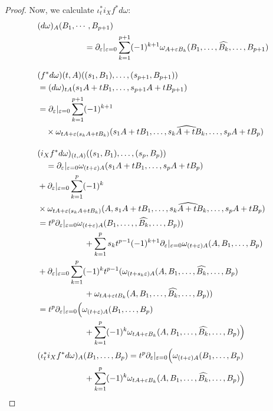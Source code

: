\documentclass[b5paper,draft,openbib,12pt]{memoir}
\begin{document}
\begin{proof}
Now, we calculate \(\iota^*_t i_X f^* d \omega\):
\begin{align}\notag
&(d\omega)_A(B_1,\cdots, B_{p+1})\\
&\hspace{2cm}=\partial_\varepsilon |_{\varepsilon=0} \sum_{k=1}^{p+1} (-1)^{k+1} \omega_{A+\varepsilon B_k}(B_1,\dots , \widehat{B_k}, \dots, B_{p+1})\\[0.3cm]
&(f^* d \omega){(t,A)}((s_1,B_1),\dots , (s_{p+1},B_{p+1}))\\\notag
&= (d\omega)_{tA}(s_1A + t B_1, \dots, s_{p+1}A+t B_{p+1})\\
&=\partial_{\varepsilon}|_{\varepsilon =0} \sum_{k=1}^{p+1}(-1)^{k+1}\\\notag
&\quad \times\omega_{tA + \varepsilon(s_kA + t B_k)}(s_1A+tB_1, \dots,  \widehat{s_k A + t B_k},\dots , s_p A  + t B_p )\\[0.4cm]
&(i_X f^* d \omega)_{(t,A)}((s_1,B_1),\dots , (s_p, B_p))\\\notag
&\quad= \partial_{\varepsilon} |_{\varepsilon =0} \omega_{(t+\varepsilon)A}(s_1A+tB_1, \dots, s_pA+t B_p)\\\notag
&+\partial_{\varepsilon}|_{\varepsilon=0} \sum_{k=1}^p (-1)^k\\\notag
&\times\omega_{tA + \varepsilon(s_k A + t B_k)} (A,s_1A+t B_1, \dots, \widehat{s_k A + t B_k},\dots, s_p A + t B_p)\\
&= t^p \partial_{\varepsilon}|_{\varepsilon=0}\omega_{(t+\varepsilon)A }(B_1,\dots, ,\widehat{B_k},\dots, B_p))\\
&\hspace{2cm}+ \sum_{k=1}^p s_k t^{p-1} (-1)^{k+1} \partial_{\varepsilon}|_{\varepsilon=0}\omega_{(t+\varepsilon)A}(A,B_1,\dots, B_p) \\
&+\partial_{\varepsilon}|_{\varepsilon=0}\sum_{k=1}^p(-1)^k t^{p-1}(\omega_{(t+s_k\varepsilon)A}(A,B_1,\dots, \widehat{B_k},\dots, B_p) \\
&\hspace{2cm} + \omega_{tA + \varepsilon t B_k}(A,B_1, \dots, \widehat{B_k},\dots, B_p))\\
&=t^p\partial_{\varepsilon}|_{\varepsilon=0} \Big(\omega_{(t+\varepsilon)A}(B_1,\dots, B_p)\\\notag
&\hspace{2cm} +\sum_{k=1}^p (-1)^k \omega_{tA+\varepsilon B_k}(A,B_1,\dots, \widehat{B_k},\dots, B_p)\Big)\\\label{li derivative 2}
&(\iota_t^* i_X f^* d \omega)_{A}(B_1,\dots ,  B_p)=t^p\partial_{\varepsilon}|_{\varepsilon=0} \Big(\omega_{(t+\varepsilon)A}(B_1,\dots, B_p)\\\notag
&\hspace{2cm}+\sum_{k=1}^p (-1)^k \omega_{tA+\varepsilon B_k}(A,B_1,\dots, \widehat{B_k},\dots, B_p)\Big)
\end{align}


\end{proof}
\end{document}
